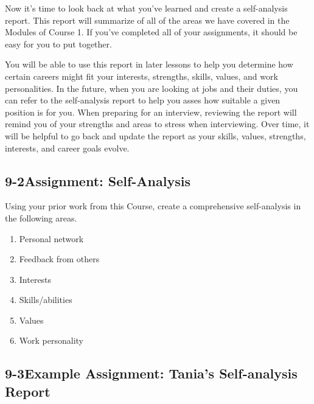 Now it's time to look back at what you've learned and create a self-analysis report. This report will summarize of all of the areas we have covered in the Modules of Course 1. If you've completed all of your assignments, it should be easy for you to put together.

You will be able to use this report in later lessons to help you determine how certain careers might fit your interests, strengths, skills, values, and work personalities. In the future, when you are looking at jobs and their duties, you can refer to the self-analysis report to help you asses how suitable a given position is for you. When preparing for an interview, reviewing the report will remind you of your strengths and areas to stress when interviewing. Over time, it will be helpful to go back and update the report as your skills, values, strengths, interests, and career goals evolve.
\pagebreak \subsection*{9-2\quad Assignment: Self-Analysis}
Using your prior work from this Course, create a comprehensive self-analysis in the following areas.
\begin{enumerate}[leftmargin=*]
\item Personal network
\item Feedback from others
\item Interests
\item Skills/abilities
\item Values
\item Work personality
\end{enumerate}
\pagebreak \subsection*{9-3\quad Example Assignment: Tania's Self-analysis Report}
